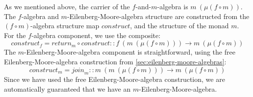 \begin{proof*}
  As we mentioned above, the carrier of the $f$-and-$m$-algebra is
  $m~(\mu(f \circ m))$. The $f$-algebra and
  $m$-Eilenberg-Moore-algebra structure are constructed from the $(f
  \circ m)$-algebra structure map $\mathit{construct}$, and the
  structure of the monad $m$.  For the $f$-algebra component, we use
  the composite:
  \begin{displaymath}
    \mathit{construct}_f = \mathit{return}_m \circ \mathit{construct} :: f~(m~(\mu(f \circ m))) \to m~(\mu(f \circ m))
  \end{displaymath}
  The $m$-Eilenberg-Moore-algebra component is straightforward, using
  the free Eilenberg-Moore-algebra construction from
  \autoref{sec:eilenberg-moore-algebras}:
  \begin{displaymath}
    \mathit{construct}_m = \mathit{join}_m :: m~(m~(\mu(f \circ m))) \to m~(\mu(f \circ m))
  \end{displaymath}
  Since we have used the free Eilenberg-Moore-algebra construction, we
  are automatically guaranteed that we have an
  $m$-Eilenberg-Moore-algebra.


\end{proof*}
